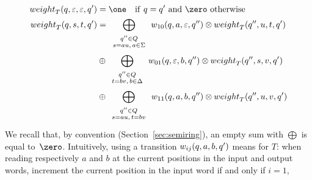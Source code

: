 \begin{align}
\weight_T(q, \varepsilon, \varepsilon, q')  & = \one 
 \quad \mathrm{if~} q = q' \mathrm{~and~} \zero \mathrm{~otherwise} \label{eq:SWT-weight}\\ 
\weight_T(q, s, t, q') & = \displaystyle\bigoplus_{\begin{array}{c}
                                                   \scriptstyle q'' \in Q\\[-1ex]
                                                   \scriptstyle s = au,\, a \in \Sigma
                                                   \end{array}} 
    \wei_{10}(q, a, \varepsilon, q'') \otimes \weight_T(q'', u, t, q')\nonumber\\
                    & \oplus \displaystyle\bigoplus_{\begin{array}{c}
                                                     \scriptstyle q'' \in Q\\[-1ex]
                                                     \scriptstyle t = bv,\, b \in \Delta\\
                                                     \end{array}} 
    \wei_{01}(q, \varepsilon, b, q'') \otimes \weight_T(q'', s, v, q')\nonumber\\
                    & \oplus \displaystyle\bigoplus_{\begin{array}{c}
                                                     \scriptstyle q'' \in Q\\[-1ex]
                                                     \scriptstyle s = au,\, t = bv\\
                                                     \end{array}} 
    \wei_{11}(q, a, b, q'') \otimes \weight_T(q'', u, v, q')\nonumber
\end{align}
%
We recall that, by convention (Section~\ref{sec:semiring}), 
an empty sum with $\bigoplus$ is equal to~$\zero$. 
%
Intuitively, using a transition $\wei_{ij}(q, a, b, q')$ means for $T$:
when reading respectively $a$ and $b$ at the current positions in the input and output words, 
increment the current position in the input word if and only if $i = 1$, 
